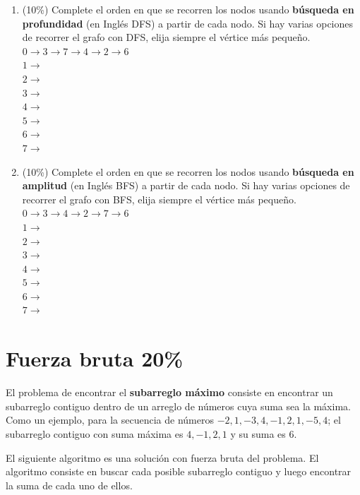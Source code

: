 \documentclass[twocolumn]{article}
\begin{document}
\begin{enumerate}[label=\Alph*]
	\item (10\%) Complete el orden en que se recorren los nodos usando \textbf{búsqueda en profundidad} (en Inglés DFS) a partir de cada nodo. Si hay varias opciones de recorrer el grafo con DFS, elija siempre el vértice más pequeño.\\


$0 \rightarrow 3 \rightarrow 7 \rightarrow 4 \rightarrow 2 \rightarrow 6 $\\
$1 \rightarrow$\\
$2 \rightarrow$\\
$3 \rightarrow$\\
$4 \rightarrow$\\
$5 \rightarrow$\\
$6 \rightarrow$\\
$7 \rightarrow$\\


\item (10\%) Complete el orden en que se recorren los nodos usando \textbf{búsqueda en amplitud} (en Inglés BFS) a partir de cada nodo. Si hay varias opciones de recorrer el grafo con BFS, elija siempre el vértice más pequeño.\\


$0 \rightarrow 3 \rightarrow 4 \rightarrow 2 \rightarrow 7 \rightarrow 6 $\\
$1 \rightarrow$\\
$2 \rightarrow$\\
$3 \rightarrow$\\
$4 \rightarrow$\\
$5 \rightarrow$\\
$6 \rightarrow$\\
$7 \rightarrow$\\


\end{enumerate}


\section{Fuerza bruta 20\%}
El problema de encontrar el \textbf{subarreglo máximo} consiste en encontrar un subarreglo contiguo dentro
de un arreglo de números cuya suma sea la máxima. Como un ejemplo, para la secuencia de
números $-2, 1, -3, 4, -1, 2, 1, -5, 4$; el subarreglo contiguo con suma máxima es 
$4, -1, 2, 1$ y su suma es $6$.

El siguiente algoritmo es una solución con fuerza bruta del
problema. El algoritmo consiste en buscar cada posible subarreglo contiguo y luego encontrar la
suma de cada uno de ellos.
\end{document}
